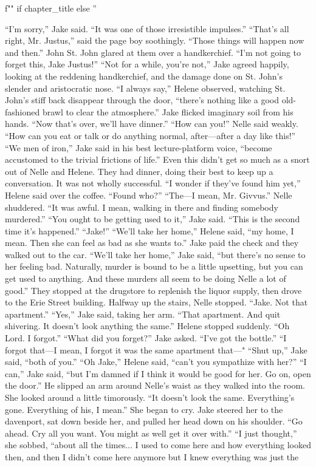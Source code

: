 \documentclass{novel}
\begin{document}
\begin{ChapterStart}
\vspace{3\nbs}
f"" if chapter_title else ''
\end{ChapterStart}

“I'm sorry,” Jake said. “It was one of those irresistible impulses.” “That’s all right, Mr. Justus,” said the page boy soothingly. “Those things will happen now and then.” John St. John glared at them over a handkerchief. “I'm not going to forget this, Jake Justus!” “Not for a while, you’re not,” Jake agreed happily, looking at the reddening handkerchief, and the damage done on St. John’s slender and aristocratic nose. “I always say,” Helene observed, watching St. John’s stiff back disappear through the door, “there’s nothing like a good old-fashioned brawl to clear the atmosphere.” Jake flicked imaginary soil from his hands. “Now that’s over, we’ll have dinner.” “How can you!” Nelle said weakly. “How can you eat or talk or do anything normal, after—after a day like this!” “We men of iron,” Jake said in his best lecture-platform voice, “become accustomed to the trivial frictions of life.” Even this didn’t get so much as a snort out of Nelle and Helene. They had dinner, doing their best to keep up a conversation. It was not wholly successful. “I wonder if they’ve found him yet,” Helene said over the coffee. “Found who?” “The—I mean, Mr. Givvus.” Nelle shuddered. “It was awful. I mean, walking in there and finding somebody murdered.” “You ought to be getting used to it,” Jake said. “This is the second time it’s happened.” “Jake!” “We’ll take her home,” Helene said, “my home, I mean. Then she can feel as bad as she wants to.” Jake paid the check and they walked out to the car. “We’ll take her home,” Jake said, “but there’s no sense to her feeling bad. Naturally, murder is bound to be a little upsetting, but you can get used to anything. And these murders all seem to be doing Nelle a lot of good.” They stopped at the drugstore to replenish the liquor supply, then drove to the Erie Street building. Halfway up the stairs, Nelle stopped. “Jake. Not that apartment.” “Yes,” Jake said, taking her arm. “That apartment. And quit shivering. It doesn’t look anything the same.” Helene stopped suddenly. “Oh Lord. I forgot.” “What did you forget?” Jake asked. “I’ve got the bottle.” “I forgot that—I mean, I forgot it was the same apartment that—" “Shut up,” Jake said, “both of you.” “Oh Jake,” Helene said, “can’t you sympathize with her?” “I can,” Jake said, “but I’m damned if I think it would be good for her. Go on, open the door.” He slipped an arm around Nelle’s waist as they walked into the room. She looked around a little timorously. “It doesn’t look the same. Everything’s gone. Everything of his, I mean.” She began to cry. Jake steered her to the davenport, sat down beside her, and pulled her head down on his shoulder. “Go ahead. Cry all you want. You might as well get it over with.” “I just thought,” she sobbed, “about all the times... I used to come here and how everything looked then, and then I didn’t come here anymore but I knew everything was just the 
\end{document}
